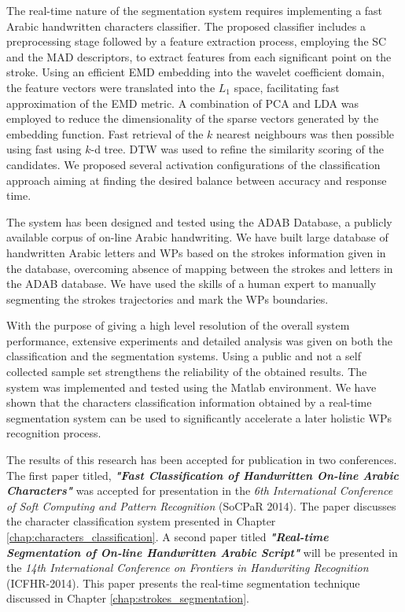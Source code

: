 The real-time nature of the segmentation system requires implementing a fast Arabic handwritten characters classifier.
The proposed classifier includes a preprocessing stage followed by a feature extraction process, employing the SC and the MAD descriptors, to extract features from each significant point on the stroke.
Using an efficient EMD embedding into the wavelet coefficient domain, the feature vectors were translated into the $L_1$ space, facilitating fast approximation of the EMD metric.
A combination of PCA and LDA was employed to reduce the dimensionality of the sparse vectors generated by the embedding function.
Fast retrieval of the $k$ nearest neighbours was then possible using fast using $k$-d tree.
DTW was used to refine the similarity scoring of the candidates.
We proposed several activation configurations of the classification approach aiming at finding the desired balance between accuracy and response time.

The system has been designed and tested using the ADAB Database, a publicly available corpus of on-line Arabic handwriting.
We have built large database of handwritten Arabic letters and WPs based on the strokes information given in the database, overcoming absence of mapping between the strokes and letters in the ADAB database.
We have used the skills of a human expert to manually segmenting the strokes trajectories and mark the WPs boundaries.

With the purpose of giving a high level resolution of the overall system performance, extensive experiments and detailed analysis was given on both the classification and the segmentation systems.
Using a public and not a self collected sample set strengthens the reliability of the obtained results.
The system was implemented and tested using the Matlab environment.
We have shown that the characters classification information obtained by a real-time segmentation system can be used to significantly accelerate a later holistic WPs recognition process.

The results of this research has been accepted for publication in two conferences.
The first paper titled, \textbf{\emph{"Fast Classification of Handwritten On-line Arabic Characters"}} was accepted for presentation in the \emph{6th International Conference of Soft Computing and Pattern Recognition} (SoCPaR 2014).
The paper discusses the character classification system presented in Chapter \ref{chap:characters_classification}.
A second paper titled \textbf{\emph{"Real-time Segmentation of On-line Handwritten Arabic Script"}} will be presented in the \emph{14th International Conference on Frontiers in Handwriting Recognition} (ICFHR-2014).
This paper presents the real-time segmentation technique discussed in Chapter \ref{chap:strokes_segmentation}.


